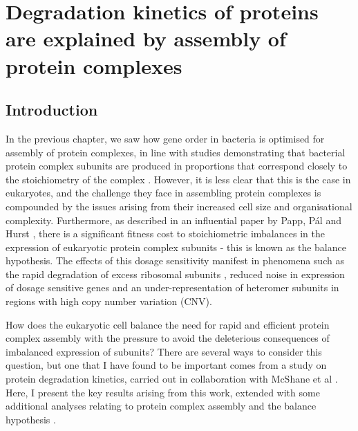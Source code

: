 \documentclass[a4paper,11pt,twoside,openright]{scrbook}
\begin{document}
\chapter{Degradation kinetics of proteins are explained by assembly of protein complexes}\label{chapter:degradation}

\section{Introduction}
In the previous chapter, we saw how gene order in bacteria is optimised for assembly of protein complexes, in line with studies demonstrating that bacterial protein complex subunits are produced in proportions that correspond closely to the stoichiometry of the complex \cite{Li2014b,Burkhardt2017}. However, it is less clear that this is the case in eukaryotes, and the challenge they face in assembling protein complexes is compounded by the issues arising from their increased cell size and organisational complexity. Furthermore, as described in an influential paper by Papp, Pál and Hurst \cite{Papp2003}, there is a significant fitness cost to stoichiometric imbalances in the expression of eukaryotic protein complex subunits - this is known as the balance hypothesis. The effects of this dosage sensitivity manifest in phenomena such as the rapid degradation of excess ribosomal subunits \cite{Warner1999,Sung2016}, reduced noise in expression of dosage sensitive genes \cite{Lehner2008} and an under-representation of heteromer subunits in regions with high copy number variation \cite{Schuster-Bockler2010} (CNV).

How does the eukaryotic cell balance the need for rapid and efficient protein complex assembly with the pressure to avoid the deleterious consequences of imbalanced expression of subunits? There are several ways to consider this question, but one that I have found to be important comes from a study on protein degradation kinetics, carried out in collaboration with McShane et al \cite{McShane2016}. Here, I present the key results arising from this work, extended with some additional analyses relating to protein complex assembly and the balance hypothesis \cite{Papp2003}.
\end{document}
